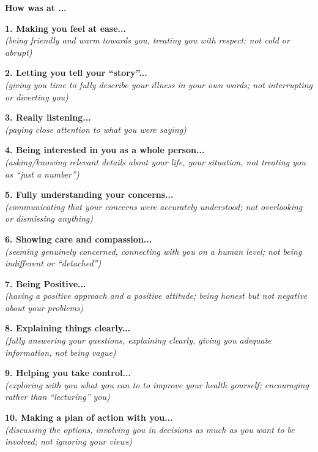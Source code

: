 \begin{small}

\begin{tcolorbox}[boxrule=1pt]
    \begin{center}
         {\large \textbf{How was \sysname at ...}}
    \end{center}
   
\end{tcolorbox}

\vspace{1em}


\noindent \textbf{1. Making you feel at ease...} \\
\textit{(being friendly and warm towards you, treating you with respect; not cold or abrupt)}
\ratingTable

\noindent \textbf{2. Letting you tell your ``story''...} \\
\textit{(giving you time to fully describe your illness in your own words; not interrupting or diverting you)}
\ratingTable

\noindent \textbf{3. Really listening...} \\
\textit{(paying close attention to what you were saying)}
\ratingTable

\noindent \textbf{4. Being interested in you as a whole person...} \\ 
\textit{(asking/knowing relevant details about your life, your situation, not treating you as ``just a number'')}
\ratingTable


\noindent \textbf{5. Fully understanding your concerns...} \\
\textit{(communicating that your concerns were accurately understood; not overlooking or dismissing anything)}
\ratingTable

\noindent \textbf{6. Showing care and compassion...} \\
\textit{(seeming genuinely concerned, connecting with you on a human level; not being indifferent or ``detached'')}
\ratingTable

\noindent \textbf{7. Being Positive...} \\
\textit{(having a positive approach and a positive attitude; being honest but not negative about your problems)}
\ratingTable

\noindent \textbf{8. Explaining things clearly...} \\
\textit{(fully answering your questions, explaining clearly, giving you adequate information, not being vague)}
\ratingTable

\noindent \textbf{9. Helping you take control...} \\
\textit{(exploring with you what you can to to improve your health yourself; encouraging rather than ``lecturing'' you)}
\ratingTable

\noindent \textbf{10. Making a plan of action with you...} \\
\textit{(discussing the options, involving you in decisions as much as you want to be involved; not ignoring your views)}
\ratingTable
\end{small}

